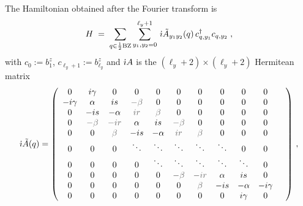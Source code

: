 The Hamiltonian obtained after the Fourier transform is 
\begin{equation}
    H \;= \; \sum_{q \in \frac{1}{2}\text{BZ}} \sum_{y_1,y_2 = 0}^{\ell_y+1} \, \dot{\imath} \tilde{A}_{y_1y_2}(q) \, c_{q,y_1}^{\dagger} c_{q,y_2}  \; ,
\end{equation}
with $c_{0} := b_1^z$, $c_{\ell_y+1} := b_{\ell_y}^z$ and $\dot{\imath} A$ is the  $(\ell_y+2)\times(\ell_y+2)$ Hermitean matrix
\begin{equation}
  \im \tilde{A}(q) = 
   \left(
\begin{array}{cccccccccccc}
 0 & i \gamma  & 0 & 0 & 0 & 0 & 0 & 0 & 0 & 0 %
 \\
 -i \gamma  & \alpha  & i s & \textcolor{black!60}{-\textcolor{black!60}{\beta}}  & 0 & 0 & 0 & 0 & 0 & 0%
 \\
 0 & -i s & -\alpha  & \textcolor{black!60}{i r} & \textcolor{black!60}{\beta}  & 0 & 0 & 0 & 0 & 0%
 \\
 0 & \textcolor{black!60}{-\textcolor{black!60}{\beta}}  & \textcolor{black!60}{- i r} & \alpha  & i s & \textcolor{black!60}{-\textcolor{black!60}{\beta}}  & 0 & 0 & 0 & 0%
 \\
 0 & 0 & \textcolor{black!60}{\beta}  & -i s & -\alpha  & \textcolor{black!60}{i r} & \textcolor{black!60}{\beta}  & 0 & 0 & 0 %
 \\
 0 & 0 & 0 & \ddots  &  \ddots & \ddots  & \ddots & \ddots  & 0 & 0%
 \\
 0 & 0 & 0 & 0 & \ddots & \ddots & \ddots  & \ddots &  \ddots  & 0 & %
 \\%
0 & 0 & 0 & 0 & 0 & \textcolor{black!60}{-\textcolor{black!60}{\beta}}  & \textcolor{black!60}{- i r} & \alpha  & i s & 0 \\
0 & 0 & 0 & 0 & 0 & 0 & \textcolor{black!60}{\beta}  & -i s & -\alpha  & -i \gamma  \\
0 & 0 & 0 & 0 & 0 & 0 & 0 & 0 & i \gamma  & 0 \\
\end{array}
\right) \,  , \label{eq:3-hamiltonian}
\end{equation}
